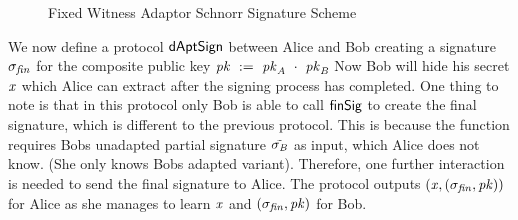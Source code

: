 \begin{figure}
    \begin{center}
        \fbox{
        \begin{varwidth}{\textwidth}
            \procedure[linenumbering]{$\procAptSig{\varSigPt}{\varWit}$}{
            (\varS \opSeperate \varRandAlice \opSeperate \varSigContext) \opFunResult \varSigPt \\
            \varSStar \opAssign \varS \opAddScalar \varWit \\
            \pcreturn \varSigApt \opAssign (\varSStar \opSeperate \varRandAlice \opSeperate \varSigContext)
            } \\
            \procedure[linenumbering]{$\procVerifyAptSig{\varSigAptAlice}{\varMsg}{\varPubKeyAlice}{\varStatement}$} {
            (\varSAlice \opSeperate \varRandAlice \opSeperate \varSigContext) \opFunResult \varSigAptAlice \\
            (\varPubKey \opSeperate \varRand) \opFunResult \varSigContext \\
            \varSchnorrChallenge \opAssign \funHash{\varMsg \opConc \varRand \opConc \varPubKey} \\
            \pcreturn \funGen{\varSAlice} \opEq \varRandAlice \opAddPoint \opPointScalar{\varPubKeyAlice}{\varSchnorrChallenge} \opAddPoint \varStatement
            }
            \procedure[linenumbering]{$\procExtWit{\varSigFin}{\varSigAlice}{\varSigAptBob}$}{
            (\varS \opSeperate \varRand) \opFunResult \varSigFin \\
            (\varSAlice \opSeperate \varRandAlice \opSeperate \varSigContext) \opFunResult \varSigAlice \\
            (\varSAptBob \opSeperate \varRandBob \opSeperate \varSigContext) \opFunResult \varSigAptBob \\
            \varSBob \opAssign \varS \opSub \varSAlice \\
            \varWit \opAssign \varSAptBob \opSub \varSBob \\
            \pcreturn (\varWit)
            }
        \end{varwidth}
        }
    \end{center}
    \caption{Fixed Witness Adaptor Schnorr Signature Scheme}
    \label{fig:aptSchnorr}
\end{figure}

We now define a protocol $\mathsf{dAptSign}$ between Alice and Bob creating a signature $\sigma_{\mathit{fin}}$ for the composite public key $\mathit{pk} ~:=~ \mathit{pk}_{\mathit{A}} ~\cdot~ \mathit{pk}_{\mathit{B}}$
Now Bob will hide his secret $\mathit{x}$ which Alice can extract after the signing process has completed.
One thing to note is that in this protocol only Bob is able to call $\mathsf{finSig}$ to create the final signature, which is different to the previous protocol.
This is because the function requires Bobs unadapted partial signature $\tilde{\sigma_{\mathit{B}}}$ as input, which Alice does not know. (She only knows Bobs adapted variant).
Therefore, one further interaction is needed to send the final signature to Alice.
The protocol outputs $(\mathit{x}, (\sigma_{\mathit{fin}}, \mathit{pk}))$ for Alice as she manages to learn $\mathit{x}$ and $(\sigma_{\mathit{fin}}, \mathit{pk})$ for Bob.

